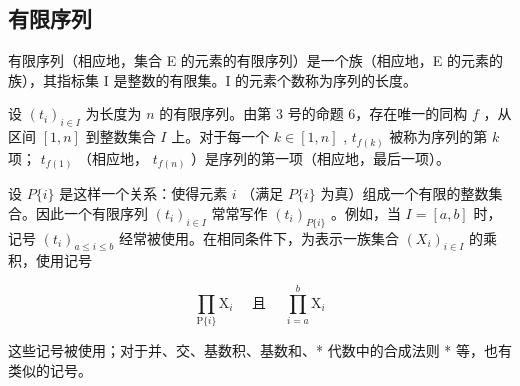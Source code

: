 \subsection{有限序列}

有限序列（相应地，集合 E 的元素的有限序列）是一个族（相应地，E 的元素的族），其指标集 I 是整数的有限集。I 的元素个数称为序列的长度。

设 \((t_i)_{i \in I}\) 为长度为 \(n\) 的有限序列。由第 3 号的命题 6，存在唯一的同构 \(f\) ，从区间 \([1, n]\) 到整数集合 \(I\) 上。对于每一个 \(k \in [1, n]\) , \(t_{f(k)}\) 被称为序列的第 \(k\) 项； \(t_{f(1)}\) （相应地， \(t_{f(n)}\) ）是序列的第一项（相应地，最后一项）。

设 \(P\{i\}\) 是这样一个关系：使得元素 \(i\) （满足 \(P\{i\}\) 为真）组成一个有限的整数集合。因此一个有限序列 \((t_i)_{i \in I}\) 常常写作 \((t_i)_{P\{i\}}\) 。例如，当 \(I = [a, b]\) 时，记号 \((t_i)_{a \leqslant i \leqslant b}\) 经常被使用。在相同条件下，为表示一族集合 \((X_i)_{i \in I}\) 的乘积，使用记号

\[
\prod_ {\mathrm{P} \{i \}} \mathrm{X} _ {i} \quad \text { 且 } \quad \prod_ {i = a} ^ {b} \mathrm{X} _ {i}
\]

这些记号被使用；对于并、交、基数积、基数和、* 代数中的合成法则 * 等，也有类似的记号。

